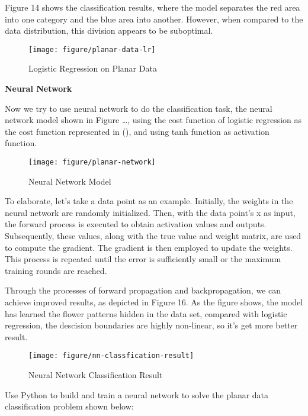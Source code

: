 \documentclass{article}
\begin{document}
Figure 14 shows the classification results, where the model separates the red area into one category and the blue area into another. However, when compared to the data distribution, this division appears to be suboptimal.

\begin{figure}[htbp]
        \centering
        \texttt{[image: figure/planar-data-lr]}
        \caption{Logistic Regression on Planar Data}
        \end{figure}


\noindent
    \textbf{Neural Network}\\
    \noindent

    Now we try to use neural network to do the classification task, the neural network model shown in Figure …, using the cost function of logistic regression as the cost function represented in (), and using tanh function as activation function.

    \begin{figure}[htbp]
        \centering
        \texttt{[image: figure/planar-network]}
        \caption{Neural Network Model}
        \end{figure}

    To elaborate, let's take a data point as an example. Initially, the weights in the neural network are randomly initialized. Then, with the data point's x as input, the forward process is executed to obtain activation values and outputs. Subsequently, these values, along with the true value and weight matrix, are used to compute the gradient. The gradient is then employed to update the weights. This process is repeated until the error is sufficiently small or the maximum training rounds are reached.

    Through the processes of forward propagation and backpropagation, we can achieve improved results, as depicted in Figure 16. As the figure shows, the model has learned the flower patterns hidden in the data set, compared with logistic regression, the descision boundaries are highly non-linear, so it's get more better result.

    \begin{figure}[htbp]
    \centering
    \texttt{[image: figure/nn-classfication-result]}
    \caption{Neural Network Classification Result}
    \end{figure}


Use Python to build and train a neural network to solve the planar data classification problem shown below:
\end{document}
